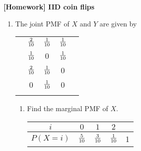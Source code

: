 \documentclass[12pt]{article}%
\newcommand{\0}{{\bf 0}}
\newcommand{\ra}[1]{\renewcommand{\arraystretch}{#1}}
\begin{document}
\newcommand{\ngi}{n \ra \infty}

\pagestyle{myheadings} 

\thispagestyle{plain}


\begin{center}
{\Large\bf [Homework] IID coin flips} 
\end{center}






\begin{enumerate}



\item
The joint PMF of $X$ and $Y$ are given by

\begin{table}[H]    \center
\begin{tabular}{|c||c|c|c||c|} \hline
{\color{red}{\bf$y_j$}}&&&&                                     \\\hline\hline  
{\color{red}{\bf 3}}&$\frac{2}{10}$&$\frac{1}{10}$&$\frac{1}{10}$&\\\hline
{\color{red}{\bf 2}}&$\frac{1}{10}$&0&$\frac{1}{10}$&\\\hline
{\color{red}{\bf 1}}&$\frac{2}{10}$&$\frac{1}{10}$&0&\\\hline
{\color{red}{\bf 0}}&0&$\frac{1}{10}$&0&\\\hline\hline
&{\color{red}{\bf 0}}&{\color{red}{\bf 1}}&{\color{red}{\bf 2}}&{\color{red}{\bf$x_i$}}\\\hline
\end{tabular}
\end{table}

\begin{enumerate}
\item
Find the marginal PMF of $X$.
\\
{\color{blue}{\bf Sol.}}

\begin{table}[H]    \center
\begin{tabular}{|c||c|c|c||c|} \hline
           $i$        &   $0$      &   $1$   &$2$    & \\
\hline 
$P(X=i)$    & $\frac{5}{10}$  & $\frac{3}{10}$&$\frac{1}{10}$ & 1\\
\hline


\end{tabular}\vspace{3mm}
\end{table}



\end{enumerate}
\end{enumerate}
\end{document}
